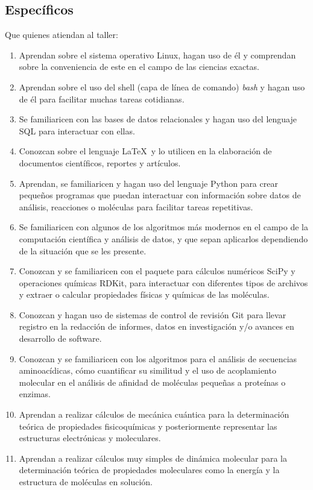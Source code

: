 \documentclass[10pt,letterpaper]{article}
\begin{document}
\subsection{Espec\'ificos}
Que quienes atiendan al taller:
\begin{enumerate}
\item Aprendan sobre el sistema operativo Linux, hagan uso de \'el y comprendan sobre la conveniencia de este en el campo de las ciencias exactas.
\item Aprendan sobre el uso del shell (capa de l\'inea de comando) \emph{bash} y hagan uso de \'el para facilitar muchas tareas cotidianas.
\item Se familiaricen con las bases de datos relacionales y hagan uso del lenguaje SQL para interactuar con ellas.
\item Conozcan sobre el lenguaje \LaTeX\ y lo utilicen en la elaboraci\'on de documentos cient\'ificos, reportes y art\'iculos.
\item Aprendan, se familiaricen y hagan uso del lenguaje Python para crear peque\~nos programas que puedan interactuar con informaci\'on sobre datos de an\'alisis, reacciones o mol\'eculas para facilitar tareas repetitivas.
\item Se familiaricen con algunos de los algoritmos m\'as modernos en el campo de la computaci\'on cient\'ifica y an\'alisis de datos, y que sepan aplicarlos dependiendo de la situaci\'on que se les presente.
\item Conozcan y se familiaricen con el paquete para c\'alculos num\'ericos SciPy y operaciones qu\'imicas RDKit, para interactuar con diferentes tipos de archivos y extraer o calcular propiedades f\'isicas y qu\'imicas de las mol\'eculas.
\item Conozcan y hagan uso de sistemas de control de revisi\'on Git para llevar registro en la redacci\'on de informes, datos en investigaci\'on y/o avances en desarrollo de software.
\item Conozcan y se familiaricen con los algoritmos para el an\'alisis de secuencias aminoac\'idicas, c\'omo cuantificar su similitud y el uso de acoplamiento molecular en el an\'alisis de afinidad de mol\'eculas peque\~nas a prote\'inas o enzimas.
\item Aprendan a realizar c\'alculos de mec\'anica cu\'antica para la determinaci\'on te\'orica de propiedades fisicoqu\'imicas y posteriormente representar las estructuras electr\'onicas y moleculares.
\item Aprendan a realizar c\'alculos muy simples de din\'amica molecular para la determinaci\'on te\'orica de propiedades moleculares como la energ\'ia y la estructura de mol\'eculas en soluci\'on.

\end{enumerate}
\end{document}
